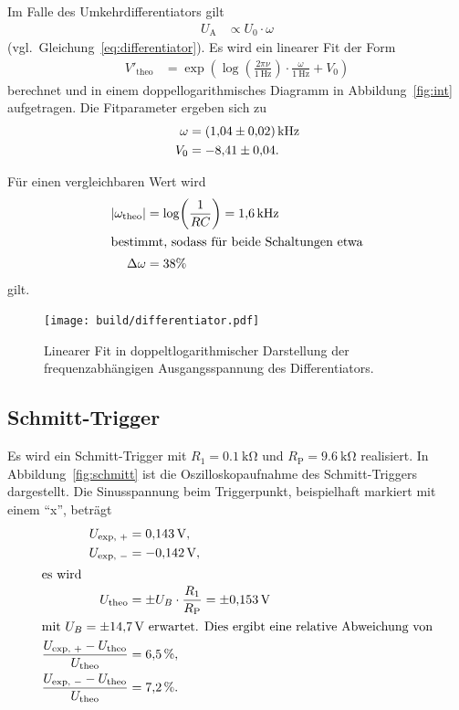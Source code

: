 Im Falle des Umkehrdifferentiators gilt
\begin{align*}
  U_\text{A} &\propto {U_0} \cdot {\omega}
\end{align*}
(vgl.\ Gleichung~\eqref{eq:differentiator}).
Es wird ein linearer Fit der Form
\begin{align*}
  V'_\text{theo} &= \exp{\left(\log{\left(\frac{2 \pi \nu}{\SI{1}{\hertz}}\right)} \cdot
\frac{\omega}{\SI{1}{\hertz}} + V_0 \right)}
\end{align*}
berechnet und in einem doppellogarithmisches Diagramm in Abbildung~\ref{fig:int} aufgetragen.
Die Fitparameter ergeben sich zu
\begin{align*}
  \omega &= \SI{1.04 \pm 0.02}{\kilo\hertz} \\
  V_0 &= \num{-8.41 \pm 0.04} .
\end{align*}

Für einen vergleichbaren Wert wird
\begin{align*}
  \left|\omega_\text{theo}\right| &= \log\!{\left(\frac{1}{RC}\right)} = \SI{1.6}{\kilo\hertz} \\
  \intertext{bestimmt, sodass für beide Schaltungen etwa}
  \Delta \omega &= \num{38}\%
\end{align*}
gilt.

\begin{figure}[ht]
  \centering
  \texttt{[image: build/differentiator.pdf]}
  \caption{Linearer Fit in doppeltlogarithmischer Darstellung der frequenzabhängigen Ausgangsspannung des Differentiators.}
  \label{fig:dif}
\end{figure}

\subsection{Schmitt-Trigger}
Es wird ein Schmitt-Trigger mit $R_1 = \SI{0.1}{\kilo\ohm}$ und $R_\text{P} = \SI{9.6}{\kilo\ohm}$ realisiert.
In Abbildung~\ref{fig:schmitt} ist die Oszilloskopaufnahme des Schmitt-Triggers dargestellt.
Die Sinusspannung beim Triggerpunkt, beispielhaft markiert mit einem \enquote{x}, beträgt
\begin{align*}
  U_\text{exp, $+$} &= \SI{0.143}{\volt}, \\
  U_\text{exp, $-$} &= \SI{-0.142}{\volt}, \\
  \intertext{es wird}
  U_\text{theo} &= \pm U_B \cdot \frac{R_1}{R_\text{P}} = \pm \SI{0.153}{\volt} \\
  \intertext{mit $U_B = \SI{\pm 14.7}{\volt}$ erwartet. Dies ergibt eine relative Abweichung von}
  \frac{U_\text{exp, $+$} - U_\text{theo}}{U_\text{theo}} &= \SI{6.5}{\percent}, \\
  \frac{U_\text{exp, $-$} - U_\text{theo}}{U_\text{theo}} &= \SI{7.2}{\percent}.
\end{align*}

